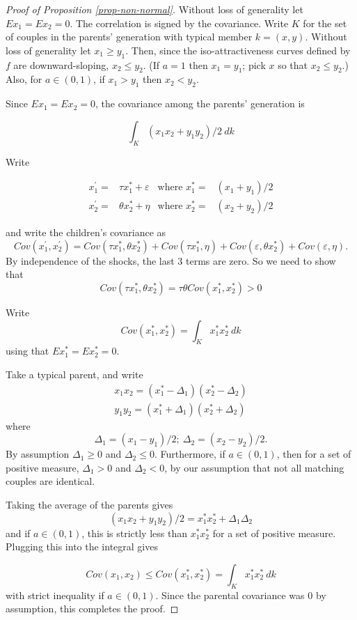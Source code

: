 \documentclass[
]{article}
\theoremstyle{definition}
\theoremstyle{definition}
\theoremstyle{definition}
\theoremstyle{definition}
\theoremstyle{remark}
\begin{document}
\begin{proof}[Proof of Proposition \ref{prop-non-normal}]
Without loss of generality let $Ex_1 = Ex_2 = 0$. The correlation is signed by
the covariance. Write $K$ for the set of couples in the parents' generation with
typical member $k = (x,y)$. Without loss of generality let $x_1 \ge y_1$. Then,
since the iso-attractiveness curves defined by $f$ are downward-sloping, 
$x_2 \le y_2$. (If $a = 1$ then $x_1 = y_1$; pick $x$ so that $x_2 \le y_2$.) Also,
for $a \in (0,1)$, if $x_1 > y_1$ then $x_2 < y_2$.

Since $Ex_1 = Ex_2 = 0$, the covariance among the parents' generation is

\[
\int_K (x_1x_2 + y_1y_2)/2 \ dk
\]

Write

\begin{align*}
x^\prime_1 =& \tau x^*_1 + \varepsilon & \textrm{where } x^*_1 =& (x_1+y_1)/2  \\
x^\prime_2 =& \theta x^*_2 + \eta & \textrm{where } x^*_2 =& (x_2+y_2)/2  
\end{align*}

and write the children's covariance as
\[
Cov(x^\prime_1, x^\prime_2) = Cov(\tau x^*_1, \theta x^*_2) + Cov(\tau x^*_1, \eta) + 
  Cov(\varepsilon, \theta x^*_2) + Cov(\varepsilon, \eta).
\]
By independence of the shocks, the last 3 terms are zero. So we need to
show that
\[
Cov(\tau x^*_1, \theta x^*_2) = \tau\theta Cov(x^*_1, x^*_2) > 0
\]

Write
\[
Cov(x^*_1, x^*_2) = \int_K x^*_1 x^*_2 \ dk
\]
using that $Ex^*_1 = Ex^*_2 = 0$. 

Take a typical parent, and write
\begin{align*}
x_1x_2 = (x^*_1 - \Delta_1)(x^*_2 - \Delta_2) \\
y_1y_2 = (x^*_1 + \Delta_1)(x^*_2 + \Delta_2)
\end{align*}
where 
\[
\Delta_1 = (x_1 - y_1)/2;\ \Delta_2 = (x_2 - y_2)/2.
\]
By assumption $\Delta_1 \ge 0$ and $\Delta_2 \le 0$. Furthermore, if $a \in (0,1)$, then
for a set of positive measure, $\Delta_1 > 0$ and $\Delta_2 < 0$, by our assumption 
that not all matching couples are identical.

Taking the average of the parents gives
\[
(x_1x_2 + y_1y_2)/2 = x^*_1x^*_2 + \Delta_1\Delta_2
\]
and if $a \in (0,1)$, this is strictly less than $x^*_1x^*_2$ for a set of 
positive measure. Plugging this into the integral gives

\[
Cov(x_1,x_2) \le Cov(x^*_1, x^*_2) = \int_K x^*_1 x^*_2 \ dk
\]
with strict inequality if $a \in (0,1)$. Since the parental covariance was 0
by assumption, this completes the proof.

\end{proof}
\end{document}
